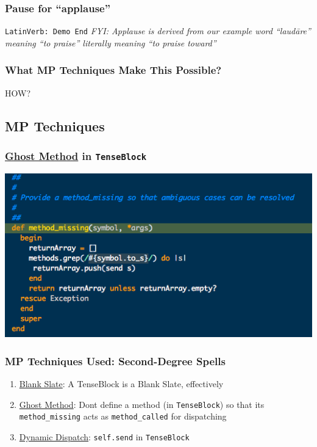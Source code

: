 \documentclass[slidestop,compress,mathserif]{beamer}
\begin{document}
\begin{frame}
	\frametitle{Pause for ``applause''}
	\begin{center}
		\texttt{LatinVerb:  Demo End}
		\pause
		\vskip 0.5cm
		\emph{FYI:  Applause is derived from our example word ``laud\={a}re'' meaning ``to praise'' literally meaning ``to praise toward''}
	\end{center}	
\end{frame}

\begin{frame}
	\frametitle{What MP Techniques Make This Possible?}
	\begin{center}
		HOW?
	\end{center}
	
\end{frame}


\subsection{MP Techniques} %
\label{sub:methods}

\begin{frame}
	\frametitle{\underline{Ghost Method} in \texttt{TenseBlock}}
	\begin{center}
		\includegraphics[scale=0.45]{img/tenseblock_mm.png}
	\end{center}
	
\end{frame}

\begin{frame}
	\frametitle{MP Techniques Used:  Second-Degree Spells}
	\begin{enumerate}
		\item \underline{Blank Slate}:  A TenseBlock is a Blank Slate, effectively
		\item \underline{Ghost Method}:  Dont define a method (in \texttt{TenseBlock}) so that its \texttt{method\_missing} acts as \texttt{method\_called} for dispatching
		\item \underline{Dynamic Dispatch}:  \texttt{self.send} in \texttt{TenseBlock}
	\end{enumerate}
\end{frame}
\end{document}
